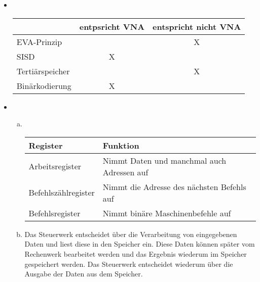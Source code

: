 \documentclass[a4paper]{scrartcl}
\begin{document}
\begin{aufgabe}
\begin{itemize}
\begin{table}[h]
\begin{tabular}{p{8cm}|p{8cm}}
				\end{tabular}
			\end{table}
		\item ~
			\begin{table}[h]
				\centering
				\begin{tabular}{l|c|c}
					 & entpsricht VNA & entspricht nicht VNA \\ \hline
					 EVA-Prinzip & & X \\
					 SISD & X &  \\
					 Tertiärspeicher &  & X \\
					 Binärkodierung & X & 
				\end{tabular}
			\end{table}
		\item ~
			\begin{enumerate}[a)]
				\item ~
					\begin{table}[h]
						\centering
						\begin{tabular}{l|l}
							Register & Funktion \\ \hline
							Arbeitsregister & Nimmt Daten und manchmal auch Adressen auf \\
							Befehlszählregister & Nimmt die Adresse des nächsten Befehls auf \\
							Befehlsregister & Nimmt binäre Maschinenbefehle auf
						\end{tabular}
					\end{table}
				\item
					Das Steuerwerk entscheidet über die Verarbeitung von eingegebenen Daten und liest diese in den Speicher ein.
					Diese Daten können später vom Rechenwerk bearbeitet werden und das Ergebnis wiederum im Speicher gespeichert werden.
					Das Steuerwerk entscheidet wiederum über die Ausgabe der Daten aus dem Speicher.
			\end{enumerate}
	\end{itemize}
\end{aufgabe}
\end{document}
